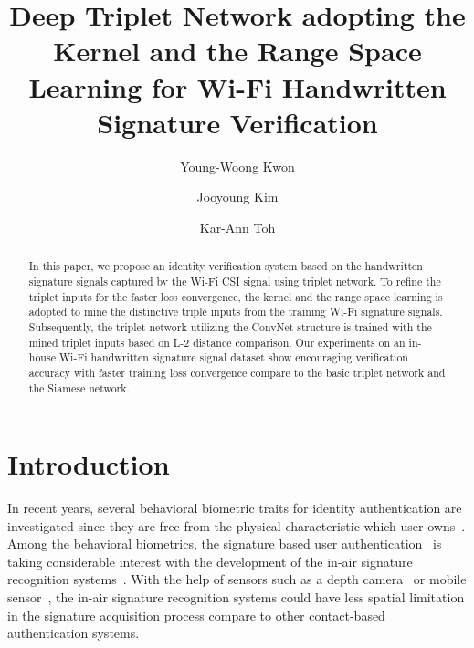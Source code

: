 \documentclass[runningheads]{llncs}
\begin{document}
%
\title{Deep Triplet Network adopting the Kernel and the Range Space Learning for Wi-Fi Handwritten Signature Verification}
%
%
\author{Young-Woong Kwon \and Jooyoung Kim \and Kar-Ann Toh}
%
%
%
\maketitle              %
%
\begin{abstract}
In this paper, we propose an identity verification system based on the handwritten signature signals captured by the Wi-Fi CSI signal using triplet network. 
To refine the triplet inputs for the faster loss convergence, the kernel and the range space learning is adopted to mine the distinctive triple inputs from the training Wi-Fi signature signals. 
Subsequently, the triplet network utilizing the ConvNet structure is trained with the mined triplet inputs based on L-2 distance comparison. 
Our experiments on an in-house Wi-Fi handwritten signature signal dataset show encouraging verification accuracy with faster training loss convergence compare to the basic triplet network and the Siamese network.

\end{abstract}
%
%
%
\section{Introduction}

In recent years, several behavioral biometric traits for identity authentication are investigated since they are free from the physical characteristic which user owns~\cite{bailador2011analysis}. Among the behavioral biometrics, the signature based user authentication~\cite{galbally2015line,sanmorino2012survey} is taking considerable interest with the development of the in-air signature recognition systems~\cite{galbally2015line,jeon2012system,malik20183dairsig}. 
With the help of sensors such as a depth camera~\cite{malik20183dairsig} or mobile sensor~\cite{jeon2012system}, the in-air signature recognition systems could have less spatial limitation in the signature acquisition process compare to other contact-based authentication systems. 
\end{document}
